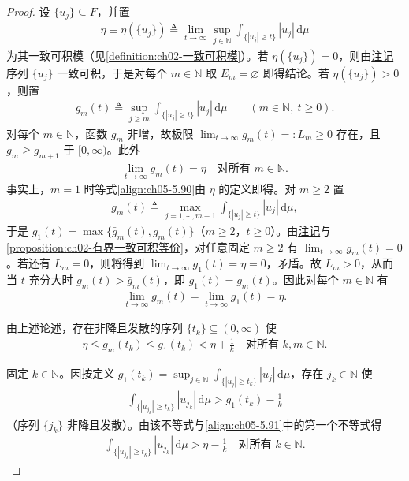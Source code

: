 \documentclass[../../main.tex]{subfiles}
\begin{document}
\begin{proof}
设 $\{u_j\}\subseteq F$，并置
\begin{align*}
\eta\equiv\eta(\{u_j\})\triangleq\lim_{t\to\infty}\sup_{j\in\mathbb{N}}\int_{\{|u_j|\geqslant t\}}|u_j|\,\mathrm{d}\mu
\end{align*}
为其一致可积模（见\cref{definition:ch02-一致可积模}）。若 $\eta(\{u_j\})=0$，则由\hyperref[remark:ch02-模零一致可积]{注记}序列 $\{u_j\}$ 一致可积，于是对每个 $m\in\mathbb{N}$ 取 $E_m=\varnothing$ 即得结论。若 $\eta(\{u_j\})>0$，则置
\begin{align}
g_m(t)\triangleq\sup_{j\geqslant m}\int_{\{|u_j|\geqslant t\}}|u_j|\,\mathrm{d}\mu
\qquad(m\in\mathbb{N},\ t\geqslant0).\label{align:ch05-5.89}
\end{align}
对每个 $m\in\mathbb{N}$，函数 $g_m$ 非增，故极限 $\lim_{t\to\infty}g_m(t)=:L_m\geqslant0$ 存在，且 $g_m\geqslant g_{m+1}$ 于 $[0,\infty)$。此外
\begin{align}
\lim_{t\to\infty}g_m(t)=\eta\quad\text{对所有 }m\in\mathbb{N}.\label{align:ch05-5.90}
\end{align}
事实上，$m=1$ 时等式\eqref{align:ch05-5.90}由 $\eta$ 的定义即得。对 $m\geqslant2$ 置
\begin{align*}
\bar g_m(t)\triangleq\max_{j=1,\cdots ,m-1}\int_{\{|u_j|\geqslant t\}}|u_j|\,\mathrm{d}\mu,
\end{align*}
于是 $g_1(t)=\max\{\bar g_m(t),g_m(t)\}$（$m\geqslant2$，$t\geqslant0$）。由\hyperref[remark:ch02-单点一致可积]{注记}与\cref{proposition:ch02-有界一致可积等价}，对任意固定 $m\geqslant2$ 有 $\lim_{t\to\infty}\bar g_m(t)=0$。若还有 $L_m=0$，则将得到 $\lim_{t\to\infty}g_1(t)=\eta=0$，矛盾。故 $L_m>0$，从而当 $t$ 充分大时 $g_m(t)>\bar g_m(t)$，即 $g_1(t)=g_m(t)$。因此对每个 $m\in\mathbb{N}$ 有
\begin{align*}
\lim_{t\to\infty}g_m(t)=\lim_{t\to\infty}g_1(t)=\eta.
\end{align*}

由上述论述，存在非降且发散的序列 $\{t_k\}\subseteq(0,\infty)$ 使
\begin{align}
\eta\leqslant g_m(t_k)\leqslant g_1(t_k)<\eta+\frac1k
\quad\text{对所有 }k,m\in\mathbb{N}.\label{align:ch05-5.91}
\end{align}

固定 $k\in\mathbb{N}$。因按定义 $g_1(t_k)=\sup_{j\in\mathbb{N}}\int_{\{|u_j|\geqslant t_k\}}|u_j|\,\mathrm{d}\mu$，存在 $j_k\in\mathbb{N}$ 使
\begin{align*}
\int_{\{|u_{j_k}|\geqslant t_k\}}|u_{j_k}|\,\mathrm{d}\mu>g_1(t_k)-\frac1k
\end{align*}
（序列 $\{j_k\}$ 非降且发散）。由该不等式与\eqref{align:ch05-5.91}中的第一个不等式得
\begin{align}
\int_{\{|u_{j_k}|\geqslant t_k\}}|u_{j_k}|\,\mathrm{d}\mu>\eta-\frac1k
\quad\text{对所有 }k\in\mathbb{N}.\label{align:ch05-5.92}
\end{align}


\end{proof}
\end{document}
